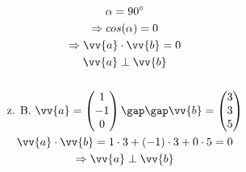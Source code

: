 \begin{gather*}
  \alpha = 90^\circ \\
  \Rightarrow cos(\alpha) = 0 \\
  \Rightarrow \vv{a} \cdot \vv{b} = 0 \\
  \vv{a} \perp \vv{b} \\\\
  \text{z. B. } \vv{a} = \begin{pmatrix}1 \\ -1 \\ 0\end{pmatrix} \gap\gap \vv{b} = \begin{pmatrix}3 \\ 3 \\ 5\end{pmatrix} \\
  \vv{a} \cdot \vv{b} = 1 \cdot 3 + (-1) \cdot 3 + 0 \cdot 5 = 0 \\
  \Rightarrow \vv{a} \perp \vv{b}
\end{gather*}

